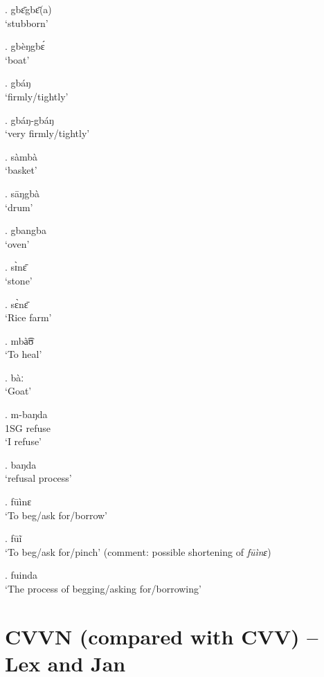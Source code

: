 \documentclass{assets/fieldnotes}
\begin{document}
\ex. gbɛ̄gbɛ̄(a)\\
`stubborn'

\ex. gbèŋgbɛ́\\
`boat'

\ex. gbáŋ\\
`firmly/tightly'

\ex. gbáŋ-gbáŋ\\
`very firmly/tightly'

\ex. sàmbà\\
`basket'

\ex. sāŋgbà\\
`drum'

\ex. gbangba\\
`oven'

\ex. sɪ̀nɛ̄\\
`stone'

\ex. sɛ̀nɛ̄\\
`Rice farm'

\ex. mbà͡ʊ\\
`To heal'

\ex. bàː\\
`Goat'


\exg. m-baŋda\\
1SG refuse\\
`I refuse'

\ex. baŋda\\
`refusal process'

\ex. fūìnɛ\\
`To beg/ask for/borrow'

\ex. fūĩ\\
`To beg/ask for/pinch' (comment: possible shortening of \textit{fūìnɛ})


\ex. fuinda\\
`The process of begging/asking for/borrowing'

\section{CVVN (compared with CVV) -- Lex and Jan}

\end{document}
